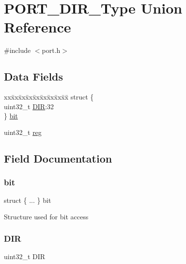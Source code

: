 \hypertarget{union_p_o_r_t___d_i_r___type}{}\section{P\+O\+R\+T\+\_\+\+D\+I\+R\+\_\+\+Type Union Reference}
\label{union_p_o_r_t___d_i_r___type}


{\ttfamily \#include $<$port.\+h$>$}

\subsection*{Data Fields}
\begin{DoxyCompactItemize}
\item 
\begin{tabbing}
xx\=xx\=xx\=xx\=xx\=xx\=xx\=xx\=xx\=\kill
struct \{\\
\>uint32\_t \mbox{\hyperlink{union_p_o_r_t___d_i_r___type_a2a3adf5d03a6421afd6b720f110cdd2c}{DIR}}:32\\
\} \mbox{\hyperlink{union_p_o_r_t___d_i_r___type_a58f28596716c24b3db7afa0e90a7f24a}{bit}}\\

\end{tabbing}\item 
uint32\+\_\+t \mbox{\hyperlink{union_p_o_r_t___d_i_r___type_a6b91636401516a477989a336376d7b40}{reg}}
\end{DoxyCompactItemize}


\subsection{Field Documentation}
\mbox{\label{union_p_o_r_t___d_i_r___type_a58f28596716c24b3db7afa0e90a7f24a}} 
\subsubsection{\texorpdfstring{bit}{bit}}
{\footnotesize\ttfamily struct \{ ... \}   bit}

Structure used for bit access \mbox{\label{union_p_o_r_t___d_i_r___type_a2a3adf5d03a6421afd6b720f110cdd2c}} 
\subsubsection{\texorpdfstring{DIR}{DIR}}
{\footnotesize\ttfamily uint32\+\_\+t D\+IR}


